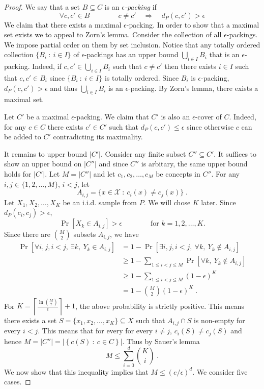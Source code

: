 \documentclass[10pt]{article}
\newcommand{\X}{\mathcal{X}}
\begin{document}
\begin{proof}
We say that a set $B \subseteq C$ is an \emph{$\epsilon$-packing} if
$$
\forall c,c' \in B \qquad \qquad c \neq c' \quad \Longrightarrow \quad d_P(c,c') > \epsilon
$$
We claim that there exists a maximal $\epsilon$-packing. In order to show that a
maximal set exists we to appeal to Zorn's lemma. Consider the collection of all
$\epsilon$-packings. We impose partial order on them by set inclusion. Notice
that any totally ordered collection $\{ B_i ~:~ i \in I \}$ of
$\epsilon$-packings has an upper bound $\bigcup_{i \in I} B_i$ that is an
$\epsilon$-packing. Indeed, if $c,c' \in \bigcup_{i \in I} B_i$ such that $c
\neq c'$ then there exists $i \in I$ such that $c,c' \in B_i$ since $\{ B_i ~:~
i \in I \}$ is totally ordered. Since $B_i$ is $\epsilon$-packing, $d_P(c,c') >
\epsilon$ and thus $\bigcup_{i \in I} B_i$ is an $\epsilon$-packing.
By Zorn's lemma, there exists a maximal set.

Let $C'$ be a maximal $\epsilon$-packing. We claim that $C'$ is also an
$\epsilon$-cover of $C$. Indeed, for any $c \in C$ there exists $c' \in C'$ such
that $d_P(c,c') \le \epsilon$ since otherwise $c$ can be added to $C'$
contradicting its maximality.

It remains to upper bound $|C'|$. Consider any finite subset $C'' \subseteq C'$.
It suffices to show an upper bound on $|C''|$ and since $C''$ is arbitary, the
same upper bound holds for $|C'|$. Let $M = |C''|$ and let $c_1, c_2, \dots,
c_M$ be concepts in $C''$. For any $i,j \in \{1,2,\dots,M\}$, $i < j$, let
$$
A_{i,j} = \{ x \in \X ~:~ c_i(x) \neq c_j(x) \} \; .
$$
Let $X_1, X_2, \dots, X_K$ be an i.i.d. sample from $P$. We will chose $K$ later.
Since $d_P(c_i, c_j) > \epsilon$,
$$
\Pr[X_k \in A_{i,j}] > \epsilon \qquad \qquad \text{for $k=1,2,\dots,K$}.
$$
Since there are $\binom{M}{2}$ subsets $A_{i,j}$, we have
\begin{align*}
\Pr\left[\forall i,j, i < j, \ \exists k, \ Y_k \in A_{i,j} \right]
& = 1 - \Pr\left[\exists i,j, i < j, \ \forall k, \ Y_k \not \in A_{i,j} \right] \\
& \ge 1 - \sum_{1 \le i < j \le M} \Pr\left[\forall k, \ Y_k \not \in A_{i,j} \right] \\
& \ge 1 - \sum_{1 \le i < j \le M} (1 - \epsilon)^K \\
& = 1 - \binom{M}{2} (1 - \epsilon)^K \; .
\end{align*}
For $K = \left\lceil \frac{\ln \binom{M}{2}}{\epsilon} \right\rceil +
1$, the above probability is strictly positive. This means there exists a set $S =
\{x_1, x_2, \dots, x_K\} \subseteq X$ such that $A_{i,j} \cap S$ is non-empty
for every $i < j$. This means that for every for every $i \neq j$, $c_i(S) \neq
c_j(S)$ and hence $M = |C''| = \left| \left\{ c(S) ~:~ c \in C \right\} \right|$.
Thus by Sauer's lemma
$$
M \le \sum_{i=0}^d \binom{K}{i} \; .
$$
We now show that this inequality implies that $M \le (e/\epsilon)^d$. We consider five cases.


\end{proof}
\end{document}
